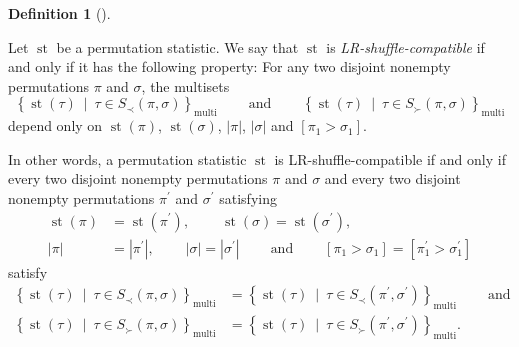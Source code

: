 \documentclass[numbers=enddot,12pt,final,onecolumn,notitlepage]{scrartcl}%
\theoremstyle{definition}
\newtheorem{defi}[theo]{Definition}
\newenvironment{definition}[1][]
{\begin{defi}[#1]\begin{leftbar}}
{\end{leftbar}\end{defi}}
\begin{document}
\begin{definition}
\label{def.LRcomp}Let $\operatorname*{st}$ be a permutation statistic. We say
that $\operatorname*{st}$ is \textit{LR-shuffle-compatible} if and only if it
has the following property: For any two disjoint nonempty permutations $\pi$
and $\sigma$, the multisets%
\[
\left\{  \operatorname*{st}\left(  \tau\right)  \ \mid\ \tau\in S_{\prec
}\left(  \pi,\sigma\right)  \right\}  _{\operatorname*{multi}}
\ \ \ \ \ \ \ \ \ \ \text{and}\ \ \ \ \ \ \ \ \ \ \left\{  \operatorname*{st}%
\left(  \tau\right)  \ \mid\ \tau\in S_{\succ}\left(  \pi,\sigma\right)
\right\}  _{\operatorname*{multi}}
\]
depend only on $\operatorname*{st}\left(  \pi\right)  $, $\operatorname*{st}%
\left(  \sigma\right)  $, $\left\vert \pi\right\vert $, $\left\vert
\sigma\right\vert $ and $\left[  \pi_{1}>\sigma_{1}\right]  $.
\end{definition}

In other words, a permutation statistic $\operatorname*{st}$ is
LR-shuffle-compatible if and only if every two disjoint nonempty permutations
$\pi$ and $\sigma$ and every two disjoint nonempty permutations $\pi^{\prime}$
and $\sigma^{\prime}$ satisfying%
\begin{align*}
\operatorname*{st}\left(  \pi\right)   &  =\operatorname*{st}\left(
\pi^{\prime}\right)  ,\ \ \ \ \ \ \ \ \ \ \operatorname*{st}\left(
\sigma\right)  =\operatorname*{st}\left(  \sigma^{\prime}\right)  ,\\
\left\vert \pi\right\vert  &  =\left\vert \pi^{\prime}\right\vert
,\ \ \ \ \ \ \ \ \ \ \left\vert \sigma\right\vert =\left\vert \sigma^{\prime
}\right\vert \ \ \ \ \ \ \ \ \ \ \text{and}\ \ \ \ \ \ \ \ \ \ \left[  \pi
_{1}>\sigma_{1}\right]  =\left[  \pi_{1}^{\prime}>\sigma_{1}^{\prime}\right]
\end{align*}
satisfy
\begin{align*}
\left\{  \operatorname*{st}\left(  \tau\right)  \ \mid\ \tau\in S_{\prec
}\left(  \pi,\sigma\right)  \right\}  _{\operatorname*{multi}} &  =\left\{
\operatorname*{st}\left(  \tau\right)  \ \mid\ \tau\in S_{\prec}\left(
\pi^{\prime},\sigma^{\prime}\right)  \right\}  _{\operatorname*{multi}%
}\ \ \ \ \ \ \ \ \ \ \text{and}\\
\left\{  \operatorname*{st}\left(  \tau\right)  \ \mid\ \tau\in S_{\succ
}\left(  \pi,\sigma\right)  \right\}  _{\operatorname*{multi}} &  =\left\{
\operatorname*{st}\left(  \tau\right)  \ \mid\ \tau\in S_{\succ}\left(
\pi^{\prime},\sigma^{\prime}\right)  \right\}  _{\operatorname*{multi}}.
\end{align*}
\end{document}
